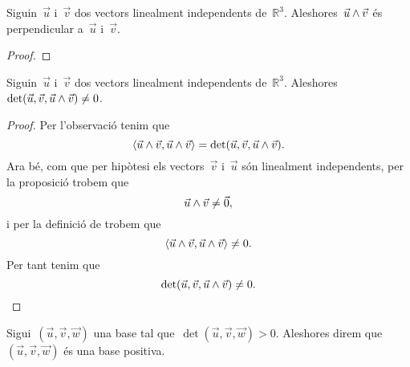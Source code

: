 \documentclass[../../Main.tex]{subfiles}
\begin{document}
	\begin{proposition}
		\label{prop:dos vectors linealment independents són perpendiculars al seu producte vectorial}
		\label{prop:el producte vectorial és perpendicular als vectors}
		Siguin~\(\vec{u}\) i~\(\vec{v}\) dos vectors linealment independents de~\(\mathbb{R}^{3}\).
		Aleshores~\(\vec{u}\mathbin{\wedge}\vec{v}\) és perpendicular a~\(\vec{u}\) i~\(\vec{v}\).
		\begin{proof}
		\end{proof}
	\end{proposition}
	\begin{proposition}
		\label{prop:el determinant de dos vectors linealment independents i el seu producte vectorial és diferent de zero}
		Siguin~\(\vec{u}\) i~\(\vec{v}\) dos vectors linealment independents de~\(\mathbb{R}^{3}\).
		Aleshores~\(\det(\vec{u},\vec{v},\vec{u}\mathbin{\wedge}\vec{v})\neq0\).
		\begin{proof}
			Per l'observació  tenim que
			\[
			    \prodesc{\vec{u}\prodvec\vec{v}}{\vec{u}\prodvec\vec{v}}=\det(\vec{u},\vec{v},\vec{u}\prodvec\vec{v}).
			\]
			Ara bé, com que per hipòtesi els vectors~\(\vec{v}\) i~\(\vec{u}\) són linealment independents, per la proposició  trobem que
			\[
			    \vec{u}\mathbin{\wedge}\vec{v}\neq\vec{0},
			\]
			i per la definició de  trobem que
			\[
			    \prodesc{\vec{u}\prodvec\vec{v}}{\vec{u}\prodvec\vec{v}}\neq0.
			\]
			Per tant tenim que
			\[
			    \det(\vec{u},\vec{v},\vec{u}\mathbin{\wedge}\vec{v})\neq0.\qedhere
			\]
		\end{proof}
	\end{proposition}
	\begin{definition}
		\label{orientació d'una base}
		\label{def:base positiva}
		Sigui~\((\vec{u},\vec{v},\vec{w})\) una base tal que~\(\det(\vec{u},\vec{v},\vec{w})>0\).
		Aleshores direm que~\((\vec{u},\vec{v},\vec{w})\) és una base positiva.
	\end{definition}
\end{document}

